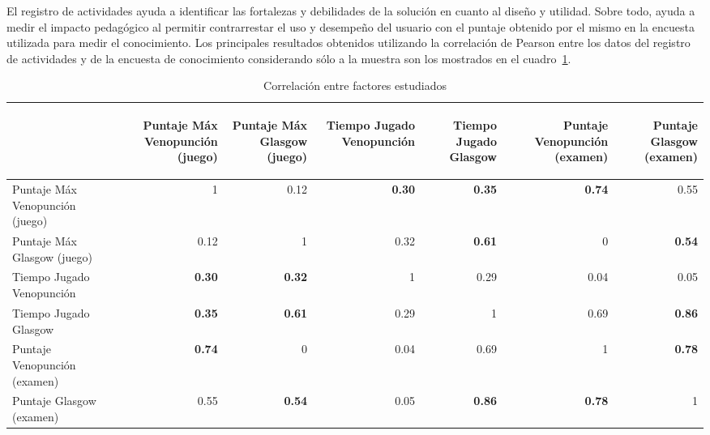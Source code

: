 El registro de actividades ayuda a identificar las  fortalezas y debilidades de
la solución en cuanto al diseño y utilidad. Sobre todo, ayuda a medir el impacto
pedagógico al permitir contrarrestar el uso y desempeño del usuario con el
puntaje obtenido por el mismo en la encuesta utilizada para medir el
conocimiento. Los principales resultados obtenidos utilizando la correlación de
Pearson\cite{BoslaughStatistics2008} entre los datos del registro de actividades
y de la encuesta de conocimiento considerando sólo a la muestra son los
mostrados en el cuadro~\ref{tab:all_correlation}.

\begin{table}[H]
\centering
\caption{Correlación entre factores estudiados} 
\begin{tabular}{lrrrrrr}
\toprule
        &
\begin{sideways}\textbf{Puntaje Máx Venopunción (juego)}\end{sideways}  &
\begin{sideways}\textbf{Puntaje Máx Glasgow (juego)}\end{sideways}        &
\begin{sideways}\textbf{Tiempo Jugado Venopunción}\end{sideways}         &
\begin{sideways}\textbf{Tiempo Jugado Glasgow}\end{sideways} &
\begin{sideways}\textbf{Puntaje Venopunción (examen)}\end{sideways}  &
\begin{sideways}\textbf{Puntaje Glasgow (examen)}\end{sideways}    \\
\midrule
Puntaje Máx Venopunción (juego)    & 1    & 0.12  & \textbf{0.30}   & \textbf{0.35} & \textbf{0.74} & 0.55 \\
Puntaje Máx Glasgow (juego)       & 0.12 & 1     & 0.32 & \textbf{0.61} & 0 & \textbf{0.54}\\
Tiempo Jugado Venopunción     		 & \textbf{0.30}  & \textbf{0.32} & 1  & 0.29 & 0.04 & 0.05\\
Tiempo Jugado Glasgow 				 & \textbf{0.35} & \textbf{0.61}  & 0.29  & 1    & 0.69 & \textbf{0.86}\\
Puntaje Venopunción (examen) & \textbf{0.74} & 0 	& 0.04  & 0.69 & 1 & \textbf{0.78} \\
Puntaje Glasgow (examen)    		 & 0.55 & \textbf{0.54} & 0.05  & \textbf{0.86} & \textbf{0.78} & 1 \\
\bottomrule               
\end{tabular}

\label{tab:all_correlation}
\end{table}

